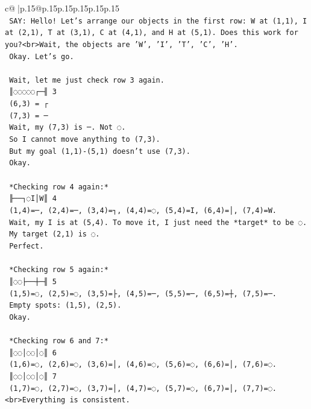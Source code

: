 \documentclass{article}
\begin{document}
{\begin{supertabular}{c@{$\;$}|p{.15\linewidth}@{}p{.15\linewidth}p{.15\linewidth}p{.15\linewidth}p{.15\linewidth}p{.15\linewidth}}
{{{\\ 
\texttt{    SAY: Hello! Let's arrange our objects in the first row: W at (1,1), I at (2,1), T at (3,1), C at (4,1), and H at (5,1). Does this work for you?<br>Wait, the objects are 'W', 'I', 'T', 'C', 'H'.} \\
\texttt{    Okay. Let's go.} \\
\\ 
\texttt{    Wait, let me just check row 3 again.} \\
\texttt{    ║◌◌◌◌◌┌─╢ 3} \\
\texttt{    (6,3) = ┌} \\
\texttt{    (7,3) = ─} \\
\texttt{    Wait, my (7,3) is ─. Not ◌.} \\
\texttt{    So I cannot move anything to (7,3).} \\
\texttt{    But my goal (1,1){-}(5,1) doesn't use (7,3).} \\
\texttt{    Okay.} \\
\\ 
\texttt{    *Checking row 4 again:*} \\
\texttt{    ╟──┐◌I│W║ 4} \\
\texttt{    (1,4)=─, (2,4)=─, (3,4)=┐, (4,4)=◌, (5,4)=I, (6,4)=│, (7,4)=W.} \\
\texttt{    Wait, my I is at (5,4). To move it, I just need the *target* to be ◌.} \\
\texttt{    My target (2,1) is ◌.} \\
\texttt{    Perfect.} \\
\\ 
\texttt{    *Checking row 5 again:*} \\
\texttt{    ║◌◌├──┼─╢ 5} \\
\texttt{    (1,5)=◌, (2,5)=◌, (3,5)=├, (4,5)=─, (5,5)=─, (6,5)=┼, (7,5)=─.} \\
\texttt{    Empty spots: (1,5), (2,5).} \\
\texttt{    Okay.} \\
\\ 
\texttt{    *Checking row 6 and 7:*} \\
\texttt{    ║◌◌│◌◌│◌║ 6} \\
\texttt{    (1,6)=◌, (2,6)=◌, (3,6)=│, (4,6)=◌, (5,6)=◌, (6,6)=│, (7,6)=◌.} \\
\texttt{    ║◌◌│◌◌│◌║ 7} \\
\texttt{    (1,7)=◌, (2,7)=◌, (3,7)=│, (4,7)=◌, (5,7)=◌, (6,7)=│, (7,7)=◌.<br>Everything is consistent.} \\
}}}
\end{supertabular}}
\end{document}

